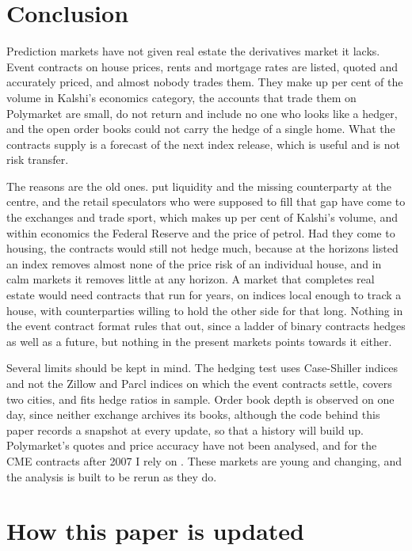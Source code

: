 \documentclass[12pt,a4paper]{article}
\begin{document}
\section{Conclusion}

Prediction markets have not given real estate the derivatives market it lacks. Event contracts on house prices, rents and mortgage rates are listed, quoted and accurately priced, and almost nobody trades them. They make up \reVolShare{} per cent of the volume in Kalshi's economics category, the accounts that trade them on Polymarket are small, do not return and include no one who looks like a hedger, and the open order books could not carry the hedge of a single home. What the contracts supply is a forecast of the next index release, which is useful and is not risk transfer.

The reasons are the old ones. \citet{fabozzi2020thirty} put liquidity and the missing counterparty at the centre, and the retail speculators who were supposed to fill that gap have come to the exchanges and trade sport, which makes up \sportsShare{} per cent of Kalshi's volume, and within economics the Federal Reserve and the price of petrol. Had they come to housing, the contracts would still not hedge much, because at the horizons listed an index removes almost none of the price risk of an individual house, and in calm markets it removes little at any horizon. A market that completes real estate would need contracts that run for years, on indices local enough to track a house, with counterparties willing to hold the other side for that long. Nothing in the event contract format rules that out, since a ladder of binary contracts hedges as well as a future, but nothing in the present markets points towards it either.

Several limits should be kept in mind. The hedging test uses Case-Shiller indices and not the Zillow and Parcl indices on which the event contracts settle, covers two cities, and fits hedge ratios in sample. Order book depth is observed on one day, since neither exchange archives its books, although the code behind this paper records a snapshot at every update, so that a history will build up. Polymarket's quotes and price accuracy have not been analysed, and for the CME contracts after 2007 I rely on \citet{fabozzi2020thirty}. These markets are young and changing, and the analysis is built to be rerun as they do.




\appendix
\section{How this paper is updated}\label{app:protocol}
\end{document}
